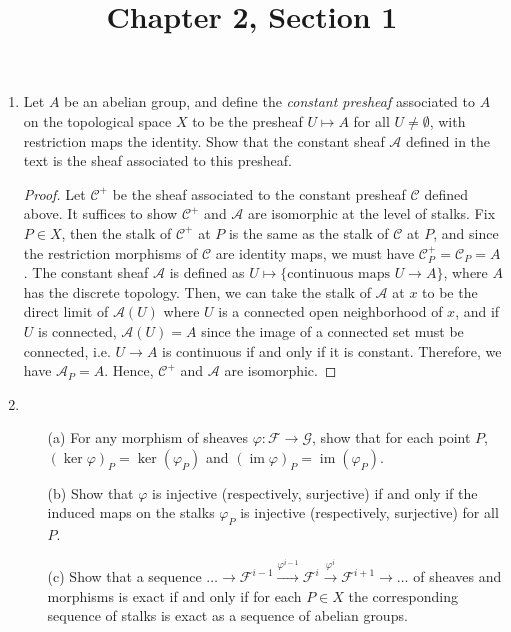 \documentclass{article}
\title{Chapter 2, Section 1}
\DeclareMathOperator{\im}{im}
\begin{document}
\maketitle
\begin{enumerate} [label=\textbf{\arabic*.}, leftmargin=0em]

\item Let $A$ be an abelian group, and define the \textit{constant presheaf} associated to $A$ on the topological space $X$ to be the presheaf $U \mapsto A$ for all $U \neq \emptyset$, with restriction maps the identity. Show that the constant sheaf $\mathscr{A}$ defined in the text is the sheaf associated to this presheaf.

\begin{proof}
    Let $\mathscr{C}^+$ be the sheaf associated to the constant presheaf $\mathscr{C}$ defined above. It suffices to show $\mathscr{C}^+$ and $\mathscr{A}$ are isomorphic at the level of stalks. Fix $P \in X$, then the stalk of $\mathscr{C}^+$ at $P$ is the same as the stalk of $\mathscr{C}$ at $P$, and since the restriction morphisms of $\mathscr{C}$ are identity maps, we must have $\mathscr{C}^+_P = \mathscr{C}_P = A$. The constant sheaf $\mathscr{A}$ is defined as $U \mapsto \{ \text{continuous maps $U \to A$}\}$, where $A$ has the discrete topology. Then, we can take the stalk of $\mathscr{A}$ at $x$ to be the direct limit of $\mathscr{A}(U)$ where $U$ is a connected open neighborhood of $x$, and if $U$ is connected, $\mathscr{A}(U) = A$ since the image of a connected set must be connected, i.e. $U \to A$ is continuous if and only if it is constant. Therefore, we have $\mathscr{A}_P = A$. Hence, $\mathscr{C}^+$ and $\mathscr{A}$ are isomorphic.
\end{proof}

\item \begin{itemize}
    \item[(a)] For any morphism of sheaves $\varphi : \mathscr{F} \to \mathscr{G}$, show that for each point $P$, $(\ker{\varphi})_P = \ker{(\varphi_P)}$ and $(\im{\varphi})_P = \im{(\varphi_P)}$.
    \item[(b)] Show that $\varphi$ is injective (respectively, surjective) if and only if the induced maps on the stalks $\varphi_P$ is injective (respectively, surjective) for all $P$.
    \item[(c)] Show that a sequence $\dots \to \mathscr{F}^{i - 1} \xrightarrow{\varphi^{i - 1}} \mathscr{F}^i \xrightarrow{\varphi^i} \mathscr{F}^{i + 1} \to \dots$ of sheaves and morphisms is exact if and only if for each $P \in X$ the corresponding sequence of stalks is exact as a sequence of abelian groups.
\end{itemize}


\end{enumerate}
\end{document}
